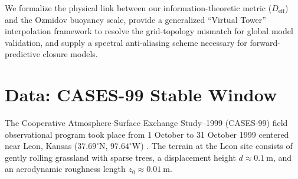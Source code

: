 \documentclass[11pt,a4paper]{article}
\begin{document}
We formalize the physical link between our information-theoretic metric ($D_{\mathrm{eff}}$) and the Ozmidov buoyancy scale, provide a generalized ``Virtual Tower'' interpolation framework to resolve the grid-topology mismatch for global model validation, and supply a spectral anti-aliasing scheme necessary for forward-predictive closure models.

\section{Data: CASES-99 Stable Window}
\label{sec:data}

The Cooperative Atmosphere-Surface Exchange Study--1999 (CASES-99) field observational program took place from 1 October to 31 October 1999 centered near Leon, Kansas ($37.69^\circ\text{N}$, $97.64^\circ\text{W}$) \citep{Poulos2002}. The terrain at the Leon site consists of gently rolling grassland with sparse trees, a displacement height $d \approx \SI{0.1}{\meter}$, and an aerodynamic roughness length $z_0 \approx \SI{0.01}{\meter}$.
\end{document}
